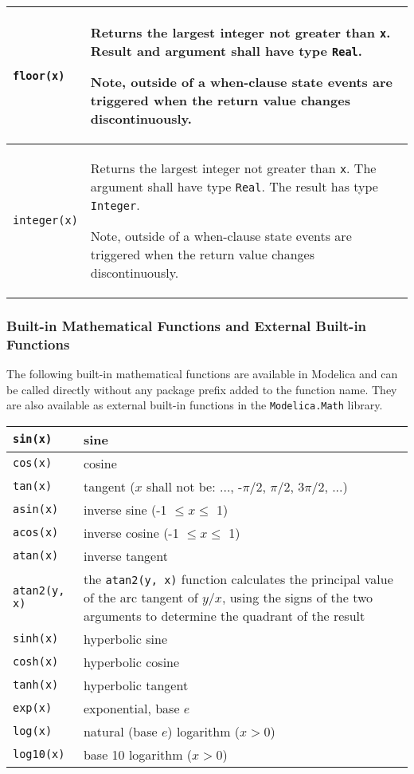 \begin{longtable}{|p{2cm}|p{12cm}|}
\lstinline!floor(x)! & Returns the largest integer not greater than \lstinline!x!. Result and
argument shall have type \lstinline!Real!.
\par
\begin{nonnormative*}
Note, outside of a when-clause state events are triggered when the return value changes discontinuously.
\end{nonnormative*}
\\ \hline
\lstinline!integer(x)! & Returns the largest integer not greater
than \lstinline!x!. The argument shall have type \lstinline!Real!. The result has type
\lstinline!Integer!.
\par
\begin{nonnormative*}
Note, outside of a when-clause state events are triggered when the return value changes discontinuously.
\end{nonnormative*}
\\ \hline
\end{longtable}

\subsubsection{Built-in Mathematical Functions and External Built-in Functions}

The following built-in mathematical functions are available in Modelica
and can be called directly without any package prefix added to the
function name. They are also available as external built-in functions in
the \lstinline!Modelica.Math! library.

\begin{longtable}{|l|p{8cm}|}
\hline \endhead
\lstinline!sin(x)! & sine\\ \hline
\lstinline!cos(x)! & cosine\\ \hline
\lstinline!tan(x)! & tangent ($x$ shall not be: ..., -$\pi$/2, $\pi$/2, 3$\pi$/2, ...)\\ \hline
\lstinline!asin(x)! & inverse sine (-1 $\le x \le$ 1)\\ \hline
\lstinline!acos(x)! & inverse cosine (-1 $\le x \le$ 1)\\ \hline
\lstinline!atan(x)! & inverse tangent\\ \hline
\lstinline!atan2(y, x)! & the \lstinline!atan2(y, x)! function calculates the principal value of the arc tangent of $y/x$, using the signs of the two arguments to determine the quadrant of the result\\ \hline
\lstinline!sinh(x)! & hyperbolic sine\\ \hline
\lstinline!cosh(x)! & hyperbolic cosine\\ \hline
\lstinline!tanh(x)! & hyperbolic tangent\\ \hline
\lstinline!exp(x)! & exponential, base $e$\\ \hline
\lstinline!log(x)! & natural (base $e$) logarithm ($x > 0$)\\ \hline
\lstinline!log10(x)! & base 10 logarithm ($x > 0$)\\ \hline
\end{longtable}

